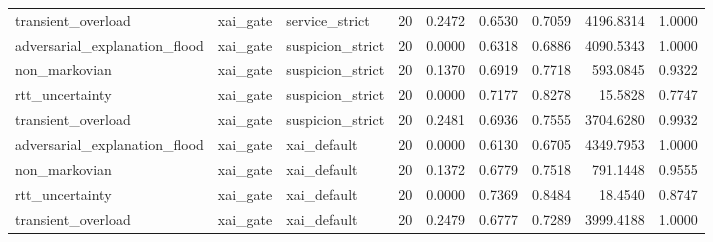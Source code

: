 \begin{table}[t]
\begin{tabular}{lllrrrrrr}
transient\_overload & xai\_gate & service\_strict & 20 & 0.2472 & 0.6530 & 0.7059 & 4196.8314 & 1.0000 \\
adversarial\_explanation\_flood & xai\_gate & suspicion\_strict & 20 & 0.0000 & 0.6318 & 0.6886 & 4090.5343 & 1.0000 \\
non\_markovian & xai\_gate & suspicion\_strict & 20 & 0.1370 & 0.6919 & 0.7718 & 593.0845 & 0.9322 \\
rtt\_uncertainty & xai\_gate & suspicion\_strict & 20 & 0.0000 & 0.7177 & 0.8278 & 15.5828 & 0.7747 \\
transient\_overload & xai\_gate & suspicion\_strict & 20 & 0.2481 & 0.6936 & 0.7555 & 3704.6280 & 0.9932 \\
adversarial\_explanation\_flood & xai\_gate & xai\_default & 20 & 0.0000 & 0.6130 & 0.6705 & 4349.7953 & 1.0000 \\
non\_markovian & xai\_gate & xai\_default & 20 & 0.1372 & 0.6779 & 0.7518 & 791.1448 & 0.9555 \\
rtt\_uncertainty & xai\_gate & xai\_default & 20 & 0.0000 & 0.7369 & 0.8484 & 18.4540 & 0.8747 \\
transient\_overload & xai\_gate & xai\_default & 20 & 0.2479 & 0.6777 & 0.7289 & 3999.4188 & 1.0000 \\
\bottomrule
\end{tabular}
\end{table}
